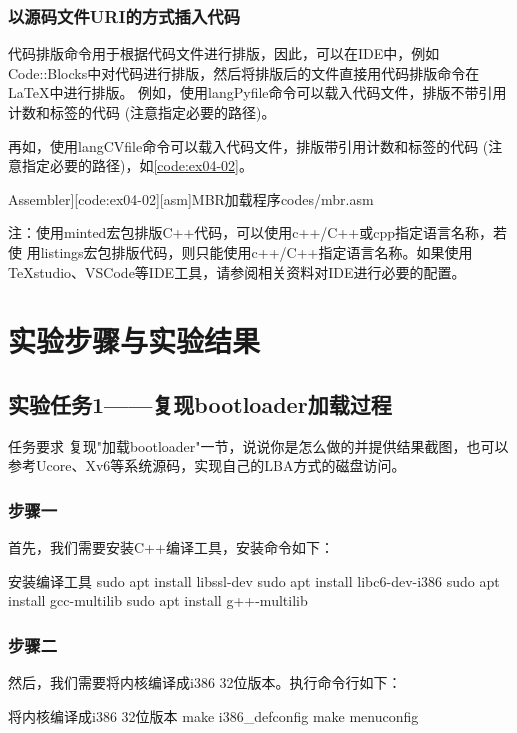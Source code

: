 \documentclass{sysucseexp}
\begin{document}
\subsubsection{以源码文件URI的方式插入代码}
代码排版命令用于根据代码文件进行排版，因此，可以在IDE中，例如
Code::Blocks中对代码进行排版，然后将排版后的文件直接用代码排版命令在
\LaTeX{}中进行排版。
例如，使用langPyfile命令可以载入代码文件，排版不带引用计数和标签的代码
(注意指定必要的路径)。


再如，使用langCVfile命令可以载入代码文件，排版带引用计数和标签的代码
(注意指定必要的路径)，如\autoref{code:ex04-02}。

\langCVfile[[x86masm]Assembler][code:ex04-02][asm]{MBR加载程序}{codes/mbr.asm}

注：使用minted宏包排版C++代码，可以使用c++/C++或cpp指定语言名称，若使
用listings宏包排版代码，则只能使用c++/C++指定语言名称。如果使用TeXstudio、VSCode等IDE工具，请参阅相关资料对IDE进行必要的配置。

\section{实验步骤与实验结果}
\subsection{实验任务1——复现bootloader加载过程}
\begin{titledBox}{任务要求}
  复现"加载bootloader"一节，说说你是怎么做的并提供结果截图，也可以参考Ucore、Xv6等系统源码，实现自己的LBA方式的磁盘访问。
\end{titledBox}
\subsubsection{步骤一}
首先，我们需要安装C++编译工具，安装命令如下：
\begin{ubtdark}{安装编译工具}
  sudo apt install libssl-dev
  sudo apt install libc6-dev-i386
  sudo apt install gcc-multilib 
  sudo apt install g++-multilib
\end{ubtdark}
\subsubsection{步骤二}
然后，我们需要将内核编译成i386 32位版本。执行命令行如下：
\begin{ubtdark}{将内核编译成i386 32位版本}
  make i386_defconfig
  make menuconfig
\end{ubtdark}
\end{document}
